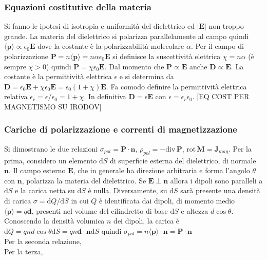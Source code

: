 \documentclass[11pt,a4paper]{article}
\newcommand{\de}{\mathrm d}
\newcommand{\dive}[1]{\text{div}\,#1}
\newcommand{\rot}[1]{\text{rot}\,#1}
\begin{document}
\subsubsection{Equazioni costitutive della materia}
Si fanno le ipotesi di isotropia e uniformità del dielettrico ed $|\mathbf E|$ non troppo grande. La materia del dielettrico si polarizza parallelamente al campo quindi $\langle \mathbf p \rangle \propto \epsilon_0\mathbf E$ dove la costante è la polarizzabilità molecolare $\alpha$. Per il campo di polarizzazione $\mathbf P = n \langle \mathbf p \rangle = n \alpha \epsilon_0 \mathbf E$ si definisce la suscettività elettrica $\chi = n\alpha$ (è sempre $\chi > 0$) quindi $\mathbf P = \chi\epsilon_0 \mathbf E$. Dal momento che $\mathbf P \propto \mathbf E$ anche $\mathbf D \propto \mathbf E$. La costante è la permittività elettrica $\epsilon$ e si determina da $\mathbf D = \epsilon_0 \mathbf E + \chi \epsilon_0 \mathbf E = \epsilon_0 (1+\chi) \mathbf E$. Fa comodo definire la permittività elettrica relativa $\epsilon_r = \epsilon/\epsilon_0 = 1 + \chi$. In definitiva $\mathbf D = \epsilon \mathbf E$ con $\epsilon = \epsilon_r \epsilon_0$. [EQ COST PER MAGNETISMO SU IRODOV]

\subsubsection{Cariche di polarizzazione e correnti di magnetizzazione}
Si dimostrano le due relazioni $\sigma_{pol} = \mathbf P \cdot \mathbf n$, $\rho_{pol} = -\dive\mathbf P$, $\rot\mathbf M = \mathbf J_{mag}$. Per la prima, considero un elemento  $\de S$ di superficie esterna del dielettrico, di normale $\mathbf n$. Il campo esterno $\mathbf E$, che in generale ha direzione arbitraria e forma l'angolo $\theta$ con $\mathbf n$, polarizza la materia del dielettrico. Se $\mathbf E \perp \mathbf n$ allora i dipoli sono paralleli a $\de S$ e la carica netta su $\de S$ è nulla. Diversamente, su $\de S$ sarà presente una densità di carica $\sigma = \de Q/\de S$ in cui $Q$ è identificata dai dipoli, di momento medio $\langle \mathbf p\rangle = q \mathbf d$, presenti nel volume del cilindretto di base $\de S$ e altezza $d\cos\theta$. Conoscendo la densità volumica $n$ dei dipoli, la carica è $\de Q = q n d \cos\theta \de S = qn\mathbf d \cdot \mathbf n \de S$ quindi $\sigma_{pol}= n \langle \mathbf p\rangle \cdot \mathbf n = \mathbf P \cdot \mathbf n$\\
Per la seconda relazione,\\
Per la terza, 
\end{document}
